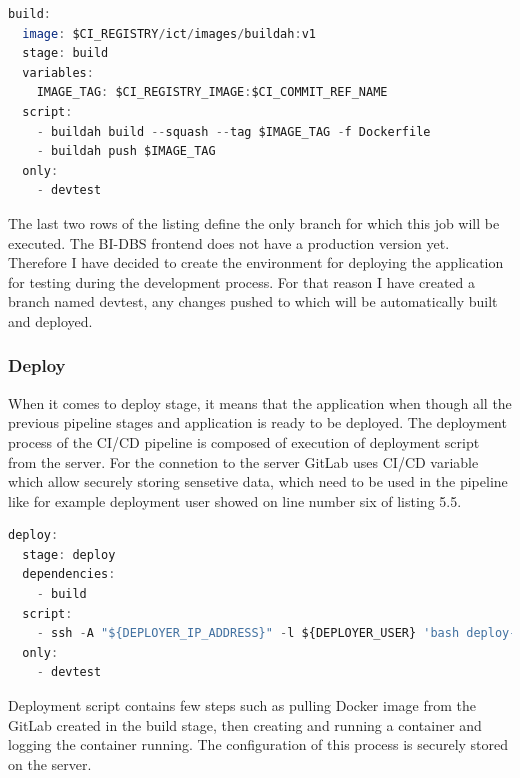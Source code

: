 \begin{lstlisting}[language=Octave, caption=Build stage in the CI/CD pipeline]
build:
  image: $CI_REGISTRY/ict/images/buildah:v1
  stage: build
  variables:
    IMAGE_TAG: $CI_REGISTRY_IMAGE:$CI_COMMIT_REF_NAME
  script:
    - buildah build --squash --tag $IMAGE_TAG -f Dockerfile
    - buildah push $IMAGE_TAG
  only:
    - devtest
\end{lstlisting}

\noindent The last two rows of the listing define the only branch for which this job will be executed. The BI-DBS frontend does not have a production version yet. Therefore I have decided to create the environment for deploying the application for testing during the development process. For that reason I have created a branch named devtest, any changes pushed to which will be automatically built and deployed.


\subsubsection{Deploy} When it comes to deploy stage, it means that the application when though all the previous pipeline stages and application is ready to be deployed. The deployment process of the CI/CD pipeline is composed of execution of deployment script from the server. For the connetion to the server GitLab uses CI/CD variable which allow securely storing sensetive data, which need to be used in the pipeline like for example deployment user showed on line number six of listing 5.5.


\begin{lstlisting}[language=Octave, caption=Deploy stage in the CI/CD pipeline]
deploy:
  stage: deploy
  dependencies:
    - build
  script:
    - ssh -A "${DEPLOYER_IP_ADDRESS}" -l ${DEPLOYER_USER} 'bash deploy-dbs-frontend.sh'
  only:
    - devtest
\end{lstlisting}


\noindent Deployment script contains few steps such as pulling Docker image from the GitLab created in the build stage, then creating and running a container and logging the container running. The configuration of this process is securely stored on the server.